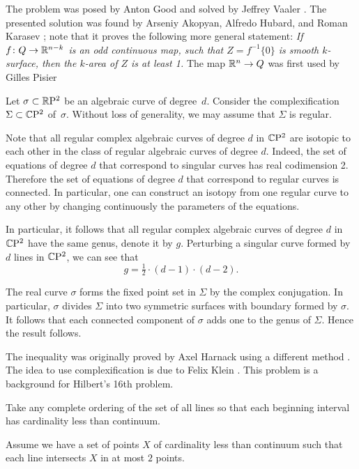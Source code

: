The problem was posed by Anton Good
and solved by Jeffrey Vaaler \cite{vaaler}.
The presented solution was found by Arseniy Akopyan, Alfredo Hubard, and Roman Karasev \cite{akopyan-hubard-karasev};
note that it proves the following more general statement:
\textit{If $f\colon Q \to \mathbb{R}^{n-k}$ is an odd continuous map, such that $Z = f^{-1}\{0\}$ is smooth $k$-surface, then the $k$-area of $Z$ is at least 1.}
The map $\mathbb{R}^n\to Q$ was first used by Gilles Pisier \cite[p. 182]{pisier}



Let $\sigma\subset \mathbb{R}\mathrm{P}^2$ be an algebraic curve of degree~$d$.
Consider the complexification $\Sigma\subset \mathbb{C}\mathrm{P}^2$ of~$\sigma$.
Without loss of generality, we may assume that $\Sigma$ is regular.

Note that all regular complex algebraic curves of degree $d$ in $\mathbb{C}\mathrm{P}^2$
are isotopic to each other in the class of regular algebraic curves of degree $d$.
Indeed, the set of equations of degree $d$ that correspond to singular curves has real codimension 2.
Therefore the set of equations of degree $d$ that correspond to regular curves is connected.
In particular, one can construct an isotopy from one regular curve to any other by changing continuously the parameters of the equations.

In particular, it follows that all regular complex algebraic curves of degree $d$ in $\mathbb{C}\mathrm{P}^2$ have the same genus,
denote it by $g$.
Perturbing a singular curve formed by $d$ lines in $\mathbb{C}\mathrm{P}^2$,
we can see that 
\[g=\tfrac12\cdot(d-1)\cdot(d-2).\]

The real curve $\sigma$ forms the fixed point set in $\Sigma$ 
by the complex conjugation. 
In particular, $\sigma$ divides $\Sigma$ into two symmetric surfaces with boundary formed by $\sigma$.
It follows that each connected component of $\sigma$ adds one to the genus of $\Sigma$.
Hence the result follows.
\qeds
 
The inequality was originally proved 
by Axel Harnack using a different method \cite{harnack}.
The idea to use complexification is due to Felix Klein \cite{klein}.
This problem is a background for Hilbert's 16th problem. 

Take any complete ordering of the set of all lines 
so that each beginning interval has cardinality less than continuum.

Assume we have a set of points $X$ of cardinality less than continuum such that each line intersects $X$ in at most $2$ points.

